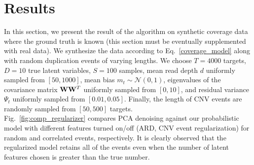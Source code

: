 \documentclass[nofootinbib,amssymb,amsmath]{revtex4}
\newcommand{\vW}{{\bf W}}
\newcommand{\norm}{{\mathcal N}}
\begin{document}
\section{Results}
In this section, we present the result of the algorithm on synthetic coverage data where the ground truth is known (this section must be eventually supplemented with real data). We synthesize the data according to Eq.~\eqref{coverage_model} along with random duplication events of varying lengths. We choose $T=4000$ targets, $D=10$ true latent variables, $S=100$ samples, mean read depth $d$ uniformly sampled from $[50, 1000]$, mean bias $m_t \sim \norm(0, 1)$, eigenvalues of the covariance matrix $\vW \vW^T$ uniformly sampled from $[0, 10]$, and residual variance $\Psi_t$ uniformly sampled from $[0.01, 0.05]$. Finally, the length of CNV events are randomly sampled from $[50, 500]$ targets.\\

Fig.~\ref{fig:comp_regularizer} compares PCA denoising against our probabilistic model with different features turned on/off (ARD, CNV event regularization) for random and correlated events, respectively. It is clearly observed that the regularized model retains all of the events even when the number of latent features chosen is greater than the true number.
\end{document}
